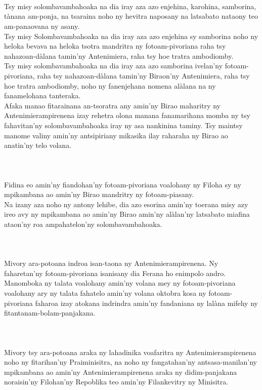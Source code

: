 \documentclass[12pt]{article}
\newcounter{laharana}
\newcommand{\andininy}[0]{
  \paragraph{%
    \NoCaseChange{%
      Andininy~\addtocounter{laharana}{1}\thelaharana.}\label{and:\thelaharana}~%
  }%
}
\begin{document}
\andininy{}Tsy misy solombavambahoaka na dia iray aza azo enjehina, karohina,
samborina, tànana am-ponja, na tsaraina noho ny hevitra naposany na latsabato
nataony teo am-panaovana ny asany.\\

\noindent
Tsy misy Solombavambahoaka na dia iray aza azo enjehina sy samborina noho ny
heloka bevava na heloka tsotra mandritra ny fotoam-pivoriana raha tsy
nahazoan-dàlana tamin'ny Antenimiera, raha tsy hoe tratra ambodiomby.\\

\noindent
Tsy misy solombavambahoaka na dia iray aza azo samborina ivelan'ny
fotoam-pivoriana, raha tsy nahazoan-dàlana tamin'ny Biraon'ny Antenimiera, raha
tsy hoe tratra ambodiomby, noho ny fanenjehana nomena alàlana na ny fanamelohana
tanteraka.\\

\noindent
Afaka manao fitarainana an-tsoratra any amin'ny Birao maharitry ny
Antenimierampirenena izay rehetra olona manana fanamarihana momba ny tsy
fahavitan'ny solombavambahoaka iray ny asa nankinina taminy. Tsy maintsy manome
valiny amin'ny antsipiriany mikasika ilay raharaha ny Birao ao anatin'ny telo
volana.

\andininy{}Fidina eo amin'ny fiandohan'ny fotoam-pivoriana voalohany ny Filoha
sy ny mpikambana ao amin'ny Birao mandritry ny fotoam-piasany.\\

\noindent
Na izany aza noho ny antony lehibe, dia azo esorina amin'ny toerana misy azy
ireo avy ny mpikambana ao amin'ny Birao amin'ny alàlan'ny latsabato miafina
ataon'ny roa ampahatelon'ny solombavambahoaka.

\andininy{}Mivory ara-potoana indroa isan-taona ny Antenimierampirenena. Ny
faharetan'ny fotoam-pivoriana isanisany dia Ferana ho enimpolo andro.\\

\noindent
Manomboka ny talata voalohany amin'ny volana mey ny fotoam-pivoriana voalohany
ary ny talata fahatelo amin'ny volana oktobra kosa ny fotoam-pivoriana faharoa
izay atokana indrindra amin'ny fandaniana ny lalàna mifehy ny
fitantanam-bolam-panjakana.

\andininy{}Mivory tsy ara-potoana araka ny lahadinika voafaritra ny
Antenimierampirenena noho ny fitarihan'ny Praiminisitra, na noho ny
fangatahan'ny antsasa-manilan'ny mpikambana ao amin'ny Antenimierampirenena
araka ny didim-panjakana noraisin'ny Filohan'ny Repoblika teo amin'ny
Filankevitry ny Minisitra.\\
\end{document}
